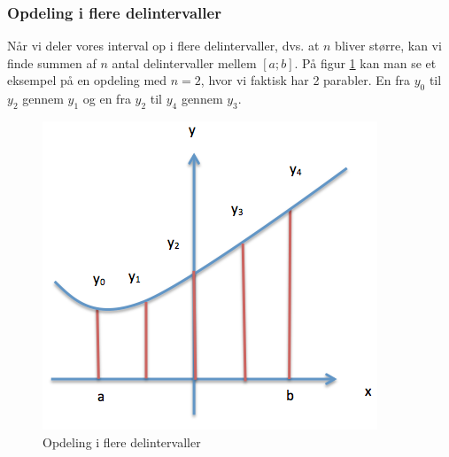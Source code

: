 \documentclass[12pt]{article}
\numberwithin{equation}{section}
\begin{document}

\subsubsection{Opdeling i flere delintervaller}
Når vi deler vores interval op i flere delintervaller, dvs. at $n$ bliver større, kan vi finde summen af $n$ antal delintervaller mellem $[a;b]$. På figur \ref{fig:simpsonOpdeling} kan man se et eksempel på en opdeling med $n=2$, hvor vi faktisk har 2 parabler. En fra $y_0$ til $y_2$ gennem $y_1$ og en fra $y_2$ til $y_4$ gennem $y_3$.
\label{sec:simpsonopdeling}
\begin{figure}[H]
\centering
\includegraphics[width=0.6\linewidth]{Billeder/simpsonOpdeling}
\caption{Opdeling i flere delintervaller}
\label{fig:simpsonOpdeling}
\end{figure}
\end{document}
